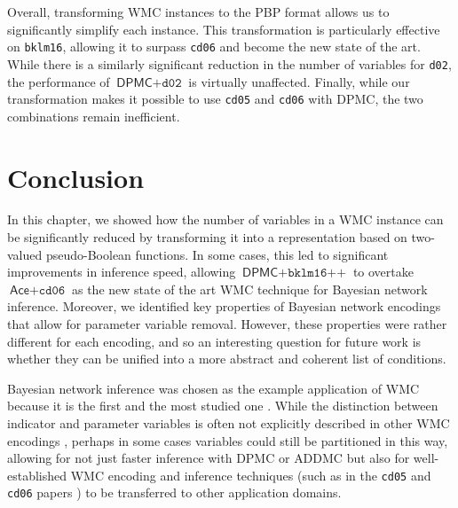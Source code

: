 Overall, transforming WMC instances to the PBP format allows us to significantly
simplify each instance. This transformation is particularly effective on
\texttt{bklm16}, allowing it to surpass \texttt{cd06} and become the new state
of the art. While there is a similarly significant reduction in the number of
variables for \texttt{d02}, the performance of $\textsf{DPMC}+\texttt{d02}$ is
virtually unaffected. Finally, while our
transformation makes it possible to use \texttt{cd05} and \texttt{cd06} with
\textsf{DPMC}, the two combinations remain inefficient.

\section{Conclusion}


In this chapter, we showed how the number of variables in a WMC instance can be
significantly reduced by transforming it into a representation based on
two-valued pseudo-Boolean functions. In some cases, this led to significant
improvements in inference speed, allowing $\textsf{DPMC} + \texttt{bklm16++}$ to
overtake $\textsf{Ace}+\texttt{cd06}$ as the new state of the art WMC technique
for Bayesian network inference. Moreover, we identified key properties of
Bayesian network encodings that allow for parameter variable removal. However,
these properties were rather different for each encoding, and so an interesting
question for future work is whether they can be unified into a more abstract and
coherent list of conditions.

Bayesian network inference was chosen as the example application of WMC because
it is the first and the most studied one
\citep{DBLP:conf/ecai/BartKLM16,DBLP:conf/ijcai/ChaviraD05,DBLP:conf/sat/ChaviraD06,DBLP:conf/kr/Darwiche02,DBLP:conf/aaai/SangBK05}.
While the distinction between indicator and parameter variables is often not
explicitly described in other WMC encodings
\citep{DBLP:journals/tplp/FierensBRSGTJR15,DBLP:journals/pacmpl/HoltzenBM20,DBLP:conf/icml/XuZFLB18},
perhaps in some cases variables could still be partitioned in this way, allowing
for not just faster inference with \textsf{DPMC} or \textsf{ADDMC} but also for
well-established WMC encoding and inference techniques (such as in the
\texttt{cd05} and \texttt{cd06} papers
\citep{DBLP:conf/ijcai/ChaviraD05,DBLP:conf/sat/ChaviraD06}) to be transferred to
other application domains.
